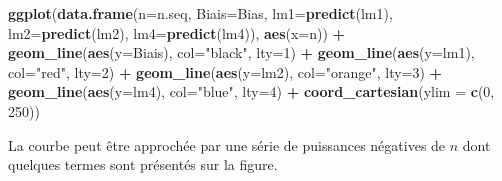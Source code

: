 \documentclass[
  11pt,
  french,
  a4paper,
  extrafontsizes,onecolumn,openright
  ]{memoir}
\newenvironment{Shaded}{\begin{snugshade}}{\end{snugshade}}
\newcommand{\DataTypeTok}[1]{\textcolor[rgb]{0.13,0.29,0.53}{#1}}
\newcommand{\DecValTok}[1]{\textcolor[rgb]{0.00,0.00,0.81}{#1}}
\newcommand{\KeywordTok}[1]{\textcolor[rgb]{0.13,0.29,0.53}{\textbf{#1}}}
\newcommand{\NormalTok}[1]{#1}
\newcommand{\OperatorTok}[1]{\textcolor[rgb]{0.81,0.36,0.00}{\textbf{#1}}}
\newcommand{\StringTok}[1]{\textcolor[rgb]{0.31,0.60,0.02}{#1}}
\begin{document}
\scriptsize

\begin{Shaded}
\begin{Highlighting}[]
\KeywordTok{ggplot}\NormalTok{(}\KeywordTok{data.frame}\NormalTok{(}\DataTypeTok{n=}\NormalTok{n.seq, }\DataTypeTok{Biais=}\NormalTok{Bias, }\DataTypeTok{lm1=}\KeywordTok{predict}\NormalTok{(lm1), }
        \DataTypeTok{lm2=}\KeywordTok{predict}\NormalTok{(lm2), }\DataTypeTok{lm4=}\KeywordTok{predict}\NormalTok{(lm4)), }\KeywordTok{aes}\NormalTok{(}\DataTypeTok{x=}\NormalTok{n)) }\OperatorTok{+}
\StringTok{  }\KeywordTok{geom_line}\NormalTok{(}\KeywordTok{aes}\NormalTok{(}\DataTypeTok{y=}\NormalTok{Biais), }\DataTypeTok{col=}\StringTok{"black"}\NormalTok{, }\DataTypeTok{lty=}\DecValTok{1}\NormalTok{) }\OperatorTok{+}
\StringTok{  }\KeywordTok{geom_line}\NormalTok{(}\KeywordTok{aes}\NormalTok{(}\DataTypeTok{y=}\NormalTok{lm1), }\DataTypeTok{col=}\StringTok{"red"}\NormalTok{, }\DataTypeTok{lty=}\DecValTok{2}\NormalTok{) }\OperatorTok{+}
\StringTok{  }\KeywordTok{geom_line}\NormalTok{(}\KeywordTok{aes}\NormalTok{(}\DataTypeTok{y=}\NormalTok{lm2), }\DataTypeTok{col=}\StringTok{"orange"}\NormalTok{, }\DataTypeTok{lty=}\DecValTok{3}\NormalTok{) }\OperatorTok{+}
\StringTok{  }\KeywordTok{geom_line}\NormalTok{(}\KeywordTok{aes}\NormalTok{(}\DataTypeTok{y=}\NormalTok{lm4), }\DataTypeTok{col=}\StringTok{"blue"}\NormalTok{, }\DataTypeTok{lty=}\DecValTok{4}\NormalTok{) }\OperatorTok{+}
\StringTok{  }\KeywordTok{coord_cartesian}\NormalTok{(}\DataTypeTok{ylim =} \KeywordTok{c}\NormalTok{(}\DecValTok{0}\NormalTok{, }\DecValTok{250}\NormalTok{))}
\end{Highlighting}
\end{Shaded}

\normalsize

La courbe peut être approchée par une série de puissances négatives de \(n\) dont quelques termes sont présentés sur la figure.

\scriptsize
\end{document}
